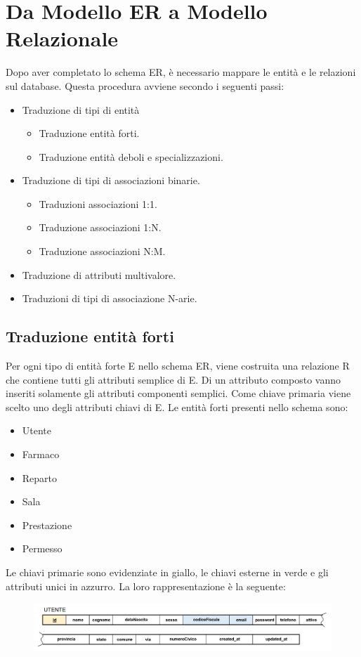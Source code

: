 \documentclass[paper=a4, fontsize=11pt,x11names]{report}
\begin{document}
\chapter{Da Modello ER a Modello Relazionale}
Dopo aver completato lo schema ER, è necessario mappare le entità e le relazioni sul database. Questa procedura avviene secondo i seguenti passi:

\begin{itemize}
\item Traduzione di tipi di entità
\begin{itemize}
\item Traduzione entità forti.
\item Traduzione entità deboli e specializzazioni.
\end{itemize}
\item Traduzione di tipi di associazioni binarie.
\begin{itemize}
\item Traduzioni associazioni 1:1.
\item Traduzione associazioni 1:N.
\item Traduzione associazioni N:M.
\end{itemize} 
\item Traduzione di attributi multivalore.
\item Traduzioni di tipi di associazione N-arie.
\end{itemize}

\section{Traduzione entità forti}
Per ogni tipo di entità forte E nello schema ER, viene costruita una relazione R che contiene tutti gli attributi semplice di E. Di un attributo composto vanno inseriti solamente gli attributi componenti semplici. Come chiave primaria viene scelto uno degli attributi chiavi di E.
Le entità forti presenti nello schema sono:
\begin{itemize}
\item Utente
\item Farmaco
\item Reparto
\item Sala
\item Prestazione
\item Permesso
\end{itemize}
Le chiavi primarie sono evidenziate in giallo, le chiavi esterne in verde e gli attributi unici in azzurro. La loro rappresentazione è la seguente:
\begin{figure}[H]
\begin{center}
\includegraphics[scale=0.4]{utenteSchema}
\end{center}
\end{figure}
\end{document}
